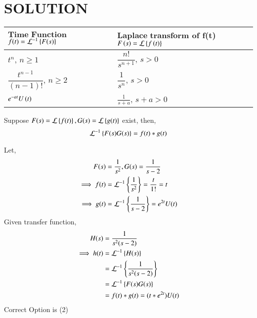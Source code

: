\documentclass[journal,12pt,twocolumn]{IEEEtran}
\begin{document}
\section{SOLUTION}
%
\begin{lemma}\label{tbl}
\begin{center}
\begin{tabular}{ |m{3cm}|m{4.5cm}| } 
 \hline
 $\textbf{Time Function}$ $f(t)=\mathcal{L}^{-1}\left\{F(s)\right\}$ & $\textbf{Laplace transform}$ of f(t) $F\left(s\right)=\mathcal{L}\left\{f\left(t\right)\right\}$ \\ 
 \hline
 $t^{n}$, $n \ge 1$ & $\dfrac{n!}{s^{n+1}}$, $s>0$ \\ 
 \hline
 $\dfrac{t^{n-1}}{(n-1)!}$, $n \ge 2$ & $\dfrac{1}{s^n}$, $s > 0$ \\
 \hline
 $e^{-at}U\left(t\right)$ & $\frac{1}{s+a}$, $s+a>0$\\
 \hline
\end{tabular}
\end{center}
\end{lemma}
\begin{theorem}
Suppose $F(s)=\mathcal{L}\left\{f(t)\right\}, G(s)=\mathcal{L}\left\{g(t)\right\}$ exist, then,
\begin{align}
    \mathcal{L}^{-1}\left\{F(s)G(s)\right\}=f(t)*g(t)\label{eq:cuf}
\end{align}
\end{theorem}
Let,
\begin{align}
    F(s) &= \frac{1}{s^2}, G(s) = \frac{1}{s-2}\\
    \implies f(t) &= \mathcal{L}^{-1}\left\{\frac{1}{s^2}\right\} = \frac{t}{1!} = t\\
    \implies g(t) &= \mathcal{L}^{-1}\left\{\frac{1}{s-2}\right\} = e^{2t}U(t)
\end{align}
Given transfer function,
\begin{align}
   H(s) &= \frac{1}{s^2(s-2)} \\
   \implies h(t) &=  \mathcal{L}^{-1}\left\{H(s)\right\}  \\
   &= \mathcal{L}^{-1}\left\{\frac{1}{s^2(s-2)}\right\}\label{eq:1}\\
   &= \mathcal{L}^{-1}\left\{F(s)G(s)\right\}\\
   &= f(t)*g(t)
   = (t*e^{2t})U(t)
\end{align}
Correct Option is (2)
\end{document}
